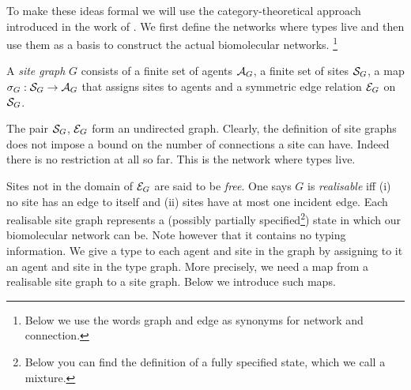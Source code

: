 To make these ideas formal we will use
the category-theoretical approach
introduced in the work of \citet{kappadpo}.
We first define the networks where types live and then
use them as a basis to construct the actual biomolecular networks.%
\footnote{
  Below we use the words graph and edge
  as synonyms for network and connection.}

\begin{definition}%
  A \emph{site graph} $G$ consists of
  a finite set of agents $\mathcal{A}_G$,
  a finite set of sites $\mathcal{S}_G$,
  a map $\sigma_G: \mathcal{S}_G \to \mathcal{A}_G$
  that assigns sites to agents
  and a symmetric edge relation $\mathcal{E}_G$ on $\mathcal{S}_G$.
\end{definition}

The pair $\mathcal{S}_G$, $\mathcal{E}_G$ form an undirected graph.
Clearly, the definition of site graphs does not impose
a bound on the number of connections a site can have.
Indeed there is no restriction at all so far.
This is the network where types live.

Sites not in the domain of $\mathcal{E}_G$ are said to be \emph{free}.
One says $G$ is \emph{realisable} iff
(i) no site has an edge to itself and
(ii) sites have at most one incident edge.
Each realisable site graph represents a
(possibly partially specified\footnote{
  Below you can find the definition of a fully specified state,
  which we call a mixture.})
state in which our biomolecular network can be.
Note however that it contains no typing information.
We give a type to each agent and site in the graph
by assigning to it an agent and site in the type graph.
More precisely,
we need a map from a realisable site graph to a site graph.
Below we introduce such maps.

